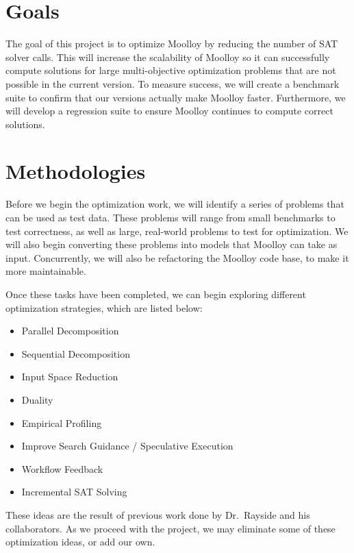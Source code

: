 \documentclass[11pt]{article}
\begin{document}
\section{Goals}\label{sec:goals}
The goal of this project is to optimize Moolloy by reducing the number
of SAT solver calls. This will increase the scalability of Moolloy so
it can successfully compute solutions for large multi-objective
optimization problems that are not possible in the current version.
To measure success, we will create a benchmark suite to confirm that
our versions actually make Moolloy faster. Furthermore, we will develop
a regression suite to ensure Moolloy continues to compute correct
solutions.

\section{Methodologies}\label{sec:methodologies}
Before we begin the optimization work, we will identify a series of
problems that can be used as test data. These problems will range from
small benchmarks to test correctness, as well as large, real-world
problems to test for optimization. We will also begin converting these
problems into models that Moolloy can take as input. Concurrently, we
will also be refactoring the Moolloy code base, to make it more
maintainable.

Once these tasks have been completed, we can begin exploring different
optimization strategies, which are listed below:

\begin{itemize}
  \item Parallel Decomposition
  \item Sequential Decomposition
  \item Input Space Reduction
  \item Duality
  \item Empirical Profiling
  \item Improve Search Guidance / Speculative Execution
  \item Workflow Feedback
  \item Incremental SAT Solving
\end{itemize}

These ideas are the result of previous work done by Dr.\ Rayside and
his collaborators. As we proceed with the project, we may eliminate
some of these optimization ideas, or add our own.
\end{document}
